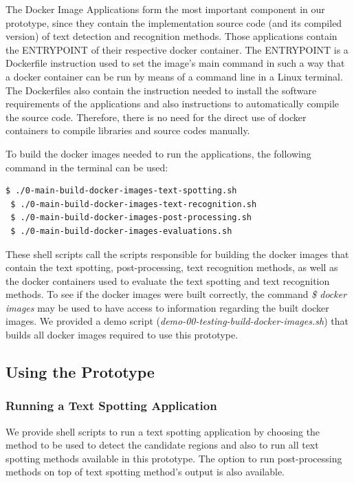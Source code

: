The Docker Image Applications form the most important component in our prototype, since they contain the implementation source code (and its compiled version) of text detection and recognition methods. Those applications contain the \textsc{ENTRYPOINT} of their respective docker container. The \textsc{ENTRYPOINT} is a Dockerfile instruction used to set the image's main command in such a way that a docker container can be run by means of a command line in a Linux terminal. The Dockerfiles also contain the instruction needed to install the software requirements of the applications and also instructions to automatically compile the source code. Therefore, there is no need for the direct use of docker containers to compile libraries and source codes manually.

To build the docker images needed to run the applications, the following command in the terminal can be used:
%
\begin{lstlisting}[style=fancyterminal]
 $ ./0-main-build-docker-images-text-spotting.sh
 $ ./0-main-build-docker-images-text-recognition.sh
 $ ./0-main-build-docker-images-post-processing.sh
 $ ./0-main-build-docker-images-evaluations.sh
\end{lstlisting}

These shell scripts call the scripts responsible for building the docker images that contain the text spotting, post-processing, text recognition methods, as well as the docker containers used to evaluate the text spotting and text recognition methods. To see if the docker images were built correctly, the command \emph{\$ docker images} may be used to have access to information regarding the built docker images. We provided a demo script (\textit{demo-00-testing-build-docker-images.sh}) that builds all docker images required to use this prototype.

\subsection{Using the Prototype}
\label{sec:using}

\subsubsection{Running a Text Spotting Application}

We provide shell scripts to run a text spotting application by choosing the method to be used to detect the candidate regions and also to run all text spotting methods available in this prototype. The option to run post-processing methods on top of text spotting method's output is also available.  

